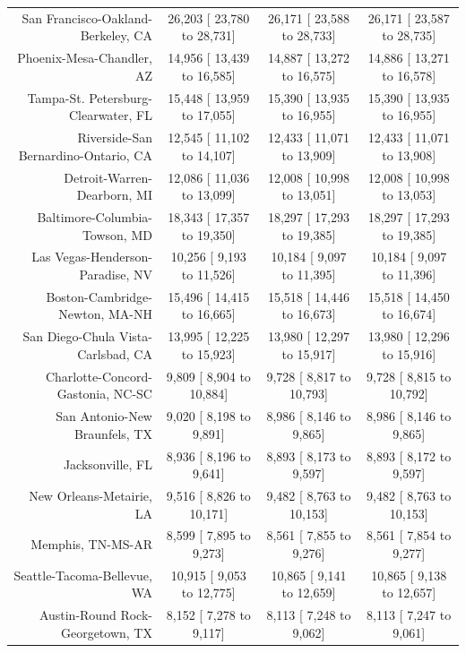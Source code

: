 \documentclass{article}
\begin{document}
\begin{table}[H]
\begin{tabular}{|r|c|c|c|}
		San Francisco-Oakland-Berkeley, CA &  26,203 [ 23,780 to  28,731] &  26,171 [ 23,588 to  28,733] &  26,171 [ 23,587 to  28,735]\\
		Phoenix-Mesa-Chandler, AZ &  14,956 [ 13,439 to  16,585] &  14,887 [ 13,272 to  16,575] &  14,886 [ 13,271 to  16,578]\\
		Tampa-St. Petersburg-Clearwater, FL &  15,448 [ 13,959 to  17,055] &  15,390 [ 13,935 to  16,955] &  15,390 [ 13,935 to  16,955]\\
		Riverside-San Bernardino-Ontario, CA &  12,545 [ 11,102 to  14,107] &  12,433 [ 11,071 to  13,909] &  12,433 [ 11,071 to  13,908]\\
		Detroit-Warren-Dearborn, MI &  12,086 [ 11,036 to  13,099] &  12,008 [ 10,998 to  13,051] &  12,008 [ 10,998 to  13,053]\\
		Baltimore-Columbia-Towson, MD &  18,343 [ 17,357 to  19,350] &  18,297 [ 17,293 to  19,385] &  18,297 [ 17,293 to  19,385]\\
		Las Vegas-Henderson-Paradise, NV &  10,256 [  9,193 to  11,526] &  10,184 [  9,097 to  11,395] &  10,184 [  9,097 to  11,396]\\
		Boston-Cambridge-Newton, MA-NH &  15,496 [ 14,415 to  16,665] &  15,518 [ 14,446 to  16,673] &  15,518 [ 14,450 to  16,674]\\
		San Diego-Chula Vista-Carlsbad, CA &  13,995 [ 12,225 to  15,923] &  13,980 [ 12,297 to  15,917] &  13,980 [ 12,296 to  15,916]\\
		Charlotte-Concord-Gastonia, NC-SC &   9,809 [  8,904 to  10,884] &   9,728 [  8,817 to  10,793] &   9,728 [  8,815 to  10,792]\\
		San Antonio-New Braunfels, TX &   9,020 [  8,198 to   9,891] &   8,986 [  8,146 to   9,865] &   8,986 [  8,146 to   9,865]\\
		Jacksonville, FL &   8,936 [  8,196 to   9,641] &   8,893 [  8,173 to   9,597] &   8,893 [  8,172 to   9,597]\\
		New Orleans-Metairie, LA &   9,516 [  8,826 to  10,171] &   9,482 [  8,763 to  10,153] &   9,482 [  8,763 to  10,153]\\
		Memphis, TN-MS-AR &   8,599 [  7,895 to   9,273] &   8,561 [  7,855 to   9,276] &   8,561 [  7,854 to   9,277]\\
		Seattle-Tacoma-Bellevue, WA &  10,915 [  9,053 to  12,775] &  10,865 [  9,141 to  12,659] &  10,865 [  9,138 to  12,657]\\
		Austin-Round Rock-Georgetown, TX &   8,152 [  7,278 to   9,117] &   8,113 [  7,248 to   9,062] &   8,113 [  7,247 to   9,061]\\

\end{tabular}
\end{table}
\end{document}
